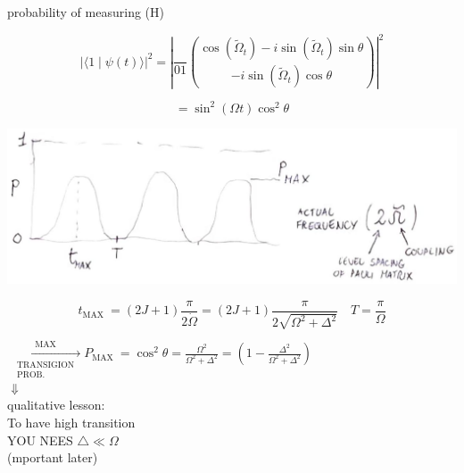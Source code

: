 \documentclass[10pt]{article}
\begin{document}
probability of measuring (H)

$$
|\langle 1 \mid \psi(t)\rangle|^{2}=\left|\frac{}{01}\binom{\cos \left(\tilde{\Omega}_{t}\right)-i \sin \left(\tilde{\Omega}_{t}\right) \sin \theta}{-i \sin \left(\tilde{\Omega}_{t}\right) \cos \theta}\right|^{2}
$$

$$
=\sin ^{2}(\Omega t) \cos ^{2} \theta
$$

\begin{center}
\includegraphics[max width=\textwidth]{2025_10_16_f02af6fa434c9f0bcc00g-12}
\end{center}

$$
t_{\text {MAX }}=(2 J+1) \frac{\pi}{2 \dot{\Omega}}=(2 J+1) \frac{\pi}{2 \sqrt{\Omega^{2}+\Delta^{2}}} \quad T=\frac{\pi}{\Omega}
$$

$\xrightarrow[\substack{\text { TRANSIGION } \\ \text { PROB. }}]{\text { MAX }} P_{\text {MAX }}=\cos ^{2} \theta=\frac{\Omega^{2}}{\Omega^{2}+\Delta^{2}}=\left(1-\frac{\Delta^{2}}{\Omega^{2}+\Delta^{2}}\right)$\\
$\Downarrow$\\
qualitative lesson:\\
To have high transition\\
YOU NEES $\triangle \ll \Omega$\\
(mportant later)
\end{document}

